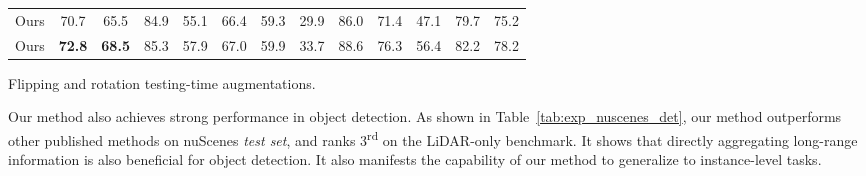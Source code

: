 \documentclass[10pt,twocolumn,letterpaper]{article}
\begin{document}
\begin{table*}[!htbp]
{\begin{threeparttable}
\begin{footnotesize}
\begin{tabular}{ l | c | c | c c c c c c c c c c }
            Ours & 70.7 & 65.5 & 84.9 & 55.1 & 66.4 & 59.3 & 29.9 & 86.0 & 71.4 & 47.1 & 79.7 & 75.2 \\
            
            Ours &	\textbf{72.8} & \textbf{68.5} & 85.3 & 57.9 & 67.0 & 59.9 & 33.7 & 88.6 & 76.3 & 56.4 & 82.2 & 78.2 \\
            
            \bottomrule                                   
        \end{tabular}
        \end{footnotesize}
        \begin{tablenotes}
          \small
          \item  Flipping and rotation testing-time augmentations.
        \end{tablenotes}
        \end{threeparttable}
    }
    \vspace{-0.2cm}
    \caption{Object detection results on nuScenes \textit{test set}. Methods published before the submission deadline (11/11/2022) are listed.}
    \label{tab:exp_nuscenes_det}   
\end{table*}

Our method also achieves strong performance in object detection. As shown in Table~\ref{tab:exp_nuscenes_det}, our method outperforms other published methods on nuScenes \textit{test set}, and ranks 3\textsuperscript{rd} on the LiDAR-only benchmark. It shows that directly aggregating long-range information is also beneficial for object detection. It also manifests the capability of our method to generalize to instance-level tasks.
\end{document}
